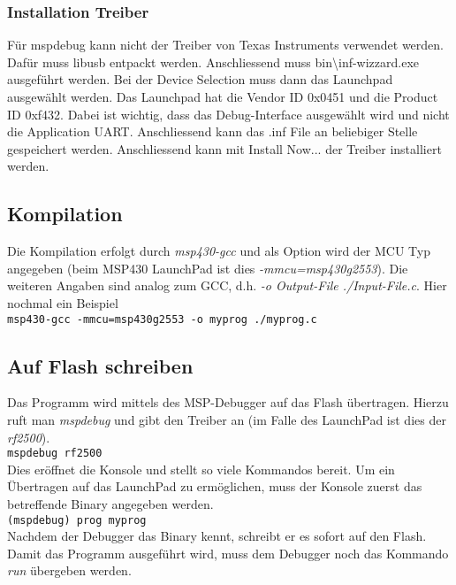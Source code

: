 \subsubsection{Installation Treiber}
Für mspdebug kann nicht der Treiber von Texas Instruments verwendet werden. 
Dafür muss libusb entpackt werden. Anschliessend muss 
bin\textbackslash inf-wizzard.exe ausgeführt werden. Bei der Device Selection
muss dann das Launchpad ausgewählt werden. Das Launchpad hat die Vendor ID 
0x0451 und die Product ID 0xf432. Dabei ist wichtig, dass das Debug-Interface
ausgewählt wird und nicht die Application UART. Anschliessend kann das .inf 
File an beliebiger Stelle gespeichert werden. Anschliessend kann mit Install 
Now... der Treiber installiert werden. 

\subsection{Kompilation}
Die Kompilation erfolgt durch \emph{msp430-gcc} und als Option wird der MCU Typ
angegeben (beim MSP430 LaunchPad ist dies \emph{-mmcu=msp430g2553}). Die weiteren
Angaben sind analog zum GCC, d.h. \emph{-o Output-File ./Input-File.c}.
Hier nochmal ein Beispiel \\

\verb?msp430-gcc -mmcu=msp430g2553 -o myprog ./myprog.c?

\subsection{Auf Flash schreiben}
Das Programm wird mittels des MSP-Debugger auf das Flash übertragen. Hierzu
ruft man \emph{mspdebug} und gibt den Treiber an (im Falle des LaunchPad ist
dies der \emph{rf2500}).\\

\verb?mspdebug rf2500?\\

\noindent
Dies eröffnet die Konsole und stellt so viele Kommandos bereit. Um ein 
Übertragen auf das LaunchPad zu ermöglichen, muss der Konsole zuerst das
betreffende Binary angegeben werden.\\

\verb?(mspdebug) prog myprog?\\

\noindent
Nachdem der Debugger das Binary kennt, schreibt er es sofort auf den Flash.
Damit das Programm ausgeführt wird, muss dem Debugger noch das Kommando 
\emph{run} übergeben werden.\\

